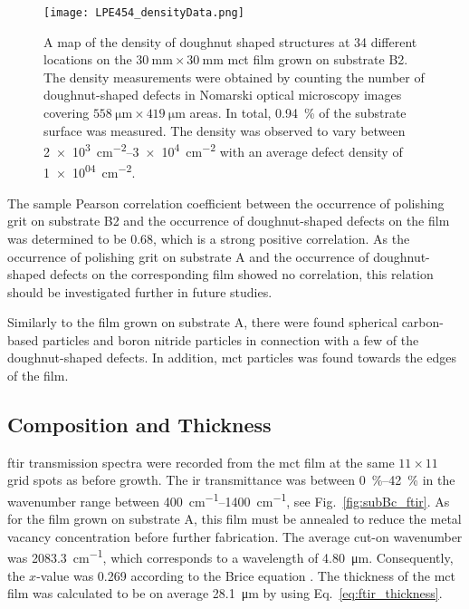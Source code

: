 \begin{figure}[htbp]
    \centering
    \texttt{[image: LPE454\_densityData.png]}
    \caption[Map of the density of doughnut shaped structures on the \ac{mct} film grown on substrate B2.]{A map of the density of doughnut shaped structures at 34 different locations on the $\SI{30}{\milli\metre}\times\SI{30}{\milli\metre}$ \ac{mct} film grown on substrate B2. The density measurements were obtained by counting the number of doughnut-shaped defects in Nomarski optical microscopy images covering $\SI{558}{\micro\metre}\times\SI{419}{\micro\metre}$ areas. In total, \SI{0.94}{\percent} of the substrate surface was measured. The density was observed to vary between \SIrange{2e+3}{3e+4}{\centi\metre^{-2}} with an average defect density of \SI{1e+04}{\centi\metre^{-2}}.}
    \label{fig:LPE454_densityData}
\end{figure}

The sample Pearson correlation coefficient between the occurrence of polishing grit on substrate B2 and the occurrence of doughnut-shaped defects on the film was determined to be \SI{+0.68}{}, which is a strong positive correlation. As the occurrence of polishing grit on substrate A and the occurrence of doughnut-shaped defects on the corresponding film showed no correlation, this relation should be investigated further in future studies.%


Similarly to the film grown on substrate A, there were found spherical carbon-based particles and boron nitride particles in connection with a few of the doughnut-shaped defects. In addition, \ac{mct} particles was found towards the edges of the film.

\subsection{Composition and Thickness}

\Ac{ftir} transmission spectra were recorded from the \ac{mct} film at the same $11\times11$ grid spots as before growth. The \ac{ir} transmittance was between \SIrange{0}{42}{\percent} in the wavenumber range between \SIrange{400}{1400}{\centi\metre^{-1}}, see Fig.~\ref{fig:subBc_ftir}. As for the film grown on substrate A, this film must be annealed to reduce the metal vacancy concentration before further fabrication. The average cut-on wavenumber was \SI{2083.3}{\centi\metre^{-1}}, which corresponds to a wavelength of \SI{4.80}{\micro\metre}. Consequently, the $x$-value was \SI{0.269}{} according to the Brice equation \citep{brice1975some}. The thickness of the \ac{mct} film was calculated to be on average \SI{28.1}{\micro\metre} by using Eq.~\ref{eq:ftir_thickness}.

